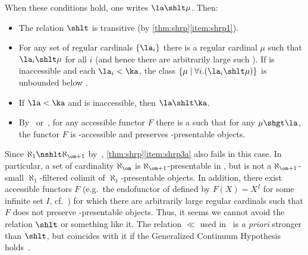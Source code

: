 \noindent
When these conditions hold, one writes %
$\la\shlt\mu$. %
Then:
\begin{itemize}
\item The relation $\shlt$ is transitive (by \cref{thm:shrp}\ref{item:shrp1}).
\item %
  For any set of regular cardinals $\{\la_i\}$ there is a regular cardinal $\mu$ such that $\la_i\shlt\mu$ for all $i$ (and hence there are arbitrarily large such \mu).
  If \ka is inaccessible and each $\la_i<\ka$, the class $\{\mu\mid \forall i .(\la_i\shlt\mu)\}$ is unbounded below \ka.
\item If $\la<\ka$ and \ka is inaccessible, then $\la\shlt\ka$.
\item By~\cite[Theorem 2.4.9]{mp:accessible} or~\cite[Theorem 2.19]{ar:loc-pres},
for any accessible functor $F$ there is a \la such that for any $\mu\shgt\la$, the functor $F$ is \mu-accessible and preserves \mu-presentable objects.
\end{itemize}

\begin{rmk}
  Since $\aleph_1\nshlt\aleph_{\om+1}$ by~\cite[Example 2.13(8)]{ar:loc-pres}, \cref{thm:shrp}\ref{item:shrp3a} also fails in this case.
  In particular, a set of cardinality $\aleph_\om$ is $\aleph_{\om+1}$-presentable in \nSet, but is not a $\aleph_{\om+1}$-small $\aleph_1$-filtered colimit of $\aleph_1$-presentable objects.
  In addition, there exist accessible functors $F$ (e.g.\ the endofunctor of \nSet defined by $F(X) = X^I$ for some infinite set $I$, cf.~\cite[Remark 3.2(4)]{br:aec-acc}) for which there are arbitrarily large regular cardinals \mu such that $F$ does not preserve \mu-presentable objects.
  Thus, it seems we cannot avoid the relation $\shlt$ or something like it.
  The relation $\ll$ used in~\cite{lurie:higher-topoi} is \textit{a priori} stronger than $\shlt$, but coincides with it if the Generalized Continuum Hypothesis holds~\cite[Fact 2.5]{lrv:intsize}.
\end{rmk}

